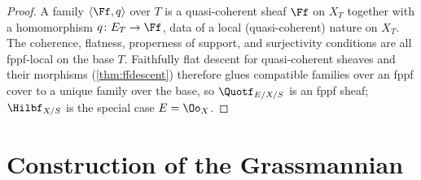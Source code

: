 \begin{proof}
  A family $\langle\Ff,q\rangle$ over $T$ is a quasi-coherent sheaf $\Ff$ on
  $X_T$ together with a homomorphism $q\colon E_T\to\Ff$, data of a local
  (quasi-coherent) nature on $X_T$. The coherence, flatness, properness of
  support, and surjectivity conditions are all fppf-local on the base $T$.
  Faithfully flat descent for quasi-coherent sheaves and their morphisms
  (\cref{thm:ffdescent}) therefore glues compatible families over an fppf cover
  to a unique family over the base, so $\Quotf_{E/X/S}$ is an fppf sheaf;
  $\Hilbf_{X/S}$ is the special case $E = \Oo_X$.
\end{proof}

\section{Construction of the Grassmannian}

